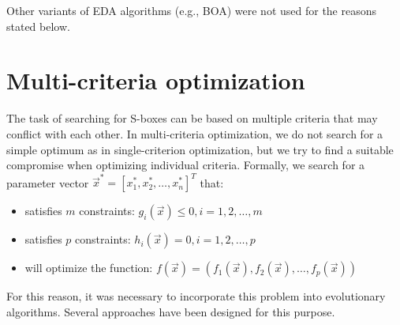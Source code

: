 Other variants of EDA algorithms (e.g., BOA) were not used for the reasons stated below.

\section{Multi-criteria optimization}
The task of searching for S-boxes can be based on multiple criteria that may conflict with each other.
In multi-criteria optimization, we do not search for a simple optimum as in single-criterion optimization, but we try to find a suitable
compromise when optimizing individual criteria. Formally, we search for a parameter vector
$ \vec{x}^* = [x^*_1, x^*_2, \dots, x^*_n]^T$ that:
\begin{itemize}
  \item satisfies $m$ constraints: $g_i(\vec{x}) \leq 0, i = 1,2,\dots, m$
  \item satisfies $p$ constraints: $h_i(\vec{x}) = 0, i = 1,2,\dots, p$
  \item will optimize the function: $f(\vec{x}) = \left(f_1(\vec{x}), f_2(\vec{x}), \dots, f_p(\vec{x}) \right)$
\end{itemize}
For this reason, it was necessary to incorporate this problem into evolutionary algorithms.
Several approaches have been designed for this purpose.

